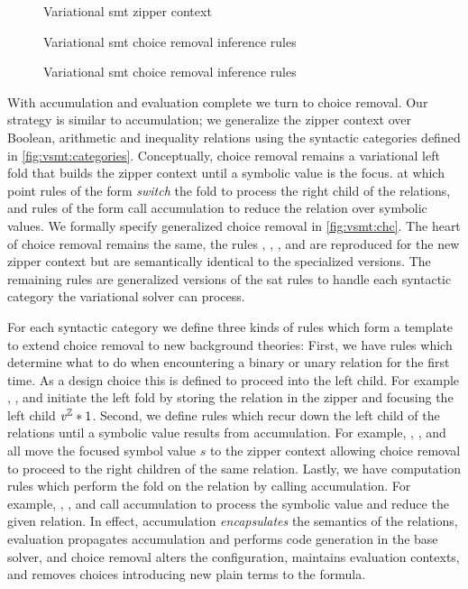 \label{section:vsmt:choice-removal}
%
\begin{figure}
  
  \caption{Variational \ac{smt} zipper context}
  \label{fig:vsmt:zipper}
\end{figure}
%
\begin{figure}
  
  \caption{Variational \ac{smt} choice removal inference rules}%
  \label{fig:vsmt:chc}
\end{figure}
%
\begin{figure}
  \ContinuedFloat
  
  \caption{Variational \ac{smt} choice removal inference rules}
  \label{fig:vsmt:chc-cont}
\end{figure}
%
With accumulation and evaluation complete we turn to choice removal.
%
Our strategy is similar to accumulation; we generalize the zipper context over
Boolean, arithmetic and inequality relations using the syntactic categories
defined in \autoref{fig:vsmt:categories}.
%
Conceptually, choice removal remains a variational left fold that builds the
zipper context until a symbolic value is the focus. at which point rules of the
form  \emph{switch} the fold to process the right child of the
relations, and rules of the form  call accumulation to reduce the
relation over symbolic values. We formally specify generalized choice removal in
\autoref{fig:vsmt:chc}. The heart of choice removal remains the same, the rules
\crEval{}, \crChc{}, \crChcT{}, and \crChcF{} are reproduced for the new zipper
context \zipper{} but are semantically identical to the specialized versions. The
remaining rules are generalized versions of the \ac{sat} rules to handle each
syntactic category the variational solver can process.

For each syntactic category we define three kinds of rules which form a template
to extend choice removal to new background theories: First, we have rules which
determine what to do when encountering a binary or unary relation for the first
time. As a design choice this is defined to proceed into the left child. For
example \crNot{}, \crBool{}, and \crInEq{} initiate the left fold by storing the
relation in the zipper and focusing the left child $\mathit{v^{\mathbb{Z}}}*{1}$.
%
Second, we define rules which recur down the left child of the relations until a
symbolic value results from accumulation. For example, \crInEqL{}, \crBoolL{},
and \crArithL{} all move the focused symbol value $s$ to the zipper context
allowing choice removal to proceed to the right children of the same relation.
%
Lastly, we have computation rules which perform the fold on the relation by
calling accumulation. For example, \crUnaryIn{}, \crArithR{}, and \crInEqR{}
call accumulation to process the symbolic value and reduce the given relation.
In effect, accumulation \emph{encapsulates} the semantics of the relations,
evaluation propagates accumulation and performs code generation in the base
solver, and choice removal alters the configuration, maintains evaluation
contexts, and removes choices introducing new plain terms to the formula.

